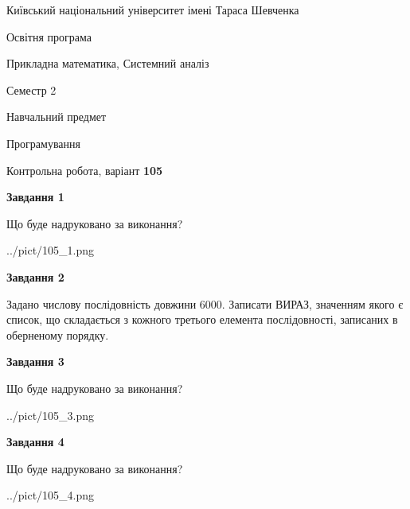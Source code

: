\documentclass[12pt, ukrainian]{article}
\begin{document}
{{\begin {small}\par
{ \center  Київський національний університет імені Тараса Шевченка \par}
{\parbox {5 cm}{Освітня програма \hfill}{\parbox {8 cm}{Прикладна математика, Системний аналіз \hfill}}\parbox {5 cm}{\hfill Семестр 2}}\par
{\parbox {5 cm} {Навчальний предмет \hfill}\parbox {7 cm}{Програмування \hfill}\parbox {6cm}{\hfill}\par}\vspace{-7pt} \end{small}}{\center Контрольна робота, варіант  \No \textbf
{ 105 }\par}}
{
\begin {large}
{\begin {center}\textbf{Завдання 1}\end {center}}\par
Що буде надруковано за виконання?\par\par
\begin{center}
	{../pict/105_1.png}
\end{center}
\newpage

{\begin {center}\textbf{Завдання 2}\end {center}}\par

 Задано числову послідовність  довжини 6000. Записати ВИРАЗ, значенням якого є список, що складається з кожного третього елемента послідовності, записаних в обернено\-му порядку.\par
\newpage

{\begin {center}\textbf{Завдання 3}\end {center}}\par
Що буде надруковано за виконання?
\begin{center}
	{../pict/105_3.png}
\end{center}
\newpage

{\begin {center}\textbf{Завдання 4}\end {center}}\par
Що буде надруковано за виконання?\par
\begin{center}
	{../pict/105_4.png}
\end{center}
\newpage


\end{large}}
\end{document}
